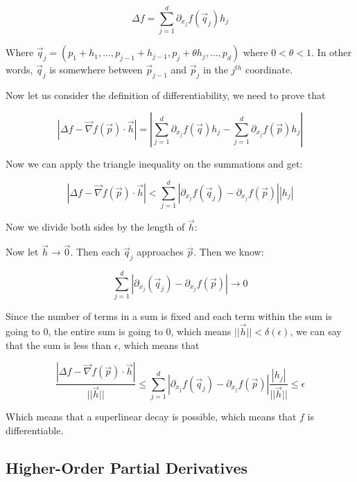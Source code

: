 \documentclass[11 pt, twoside]{article}
\newcommand{\gradient}{\vec{\nabla}}
\begin{document}
$$\Delta f = \sum_{j=1}^d \partial_{x_j} f(\vec{q}_j) h_j$$

Where $\vec{q}_j = (p_1 + h_1, \dots, p_{j-1} + h_{j-1}, p_j + \theta h_j,
\dots, p_d)$ where $0 < \theta < 1$. In other words, $\vec{q}_j$ is somewhere
between $\vec{p}_{j-1}$ and $\vec{p}_{j}$ in the $j^{th}$ coordinate.

Now let us consider the definition of differentiability, we need to prove that 


$$|\Delta f - \vec{\nabla}f(\vec{p}) \cdot \vec{h}| = |\sum_{j = 1}^d
\partial_{x_j} f(\vec{q}) h_j - \sum_{j = 1}^d \partial_{x_j} f(\vec{p}) h_j|$$

Now we can apply the triangle inequality on the summations and get:

$$|\Delta f - \vec{\nabla}f(\vec{p}) \cdot \vec{h}| < \sum_{j=1}^d |\partial_{x_j} f(\vec{q}_j) - \partial_{x_j} f(\vec{p})|
 |h_j|$$

Now we divide both sides by the length of $\vec{h}$:


Now let $\vec{h} \to \vec{0}$. Then each $\vec{q}_j$ approaches $\vec{p}$. Then
we know:

$$\sum_{j=1}^d |\partial_{x_j} (\vec{q}_j) - \partial_{x_j} f(\vec{p})| \to 0$$

Since the number of terms in a sum is fixed and each term within the sum is
going to 0, the entire sum is going to 0, which means $||\vec{h}|| <
\delta(\epsilon)$, we can say that the sum is less than $\epsilon$, which
means that

$$\frac{|\Delta f - \vec{\nabla} f(\vec{p}) \cdot \vec{h}|}{||\vec{h}||} \leq
\sum_{j=1}^d |\partial_{x_j} f(\vec{q}_j) - \partial_{x_j} f(\vec{p})| 
\frac{|h_j|}{||\vec{h}||} \leq \epsilon$$

Which means that a superlinear decay is possible, which means that $f$ is
differentiable.

\subsection{Higher-Order Partial Derivatives}
\end{document}
